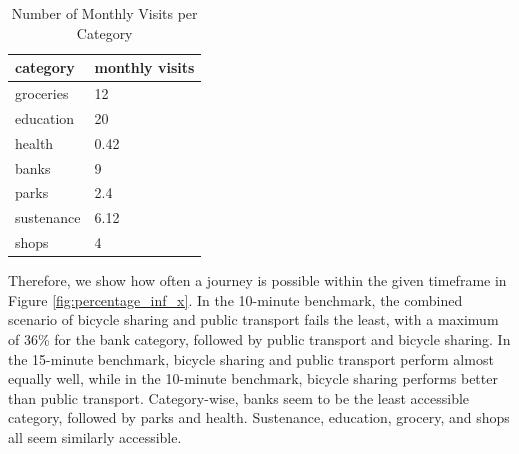 \begin{table}
  \caption{Number of Monthly Visits per Category}
  \label{tab:monthly_visits}
  \begin{center}
    \begin{tabular}[c]{|l|l|}
      \hline
      category & monthly visits \\
      \hline
      groceries & 12 \\
    \hline
      education & 20 \\
    \hline
      health & 0.42 \\
    \hline
      banks & 9 \\
    \hline
      parks & 2.4 \\
    \hline
      sustenance & 6.12 \\
    \hline
      shops & 4 \\
      \hline
    \end{tabular}
  \end{center}
\end{table}

Therefore, we show how often a journey is possible within the given timeframe in Figure \ref{fig:percentage_inf_x}.
In the 10-minute benchmark, the combined scenario of bicycle sharing and public transport fails the least, with a maximum of 36\% for the bank category, followed by public transport and bicycle sharing.
In the 15-minute benchmark, bicycle sharing and public transport perform almost equally well, while in the 10-minute benchmark, bicycle sharing performs better than public transport.
Category-wise, banks seem to be the least accessible category, followed by parks and health.
Sustenance, education, grocery, and shops all seem similarly accessible.


